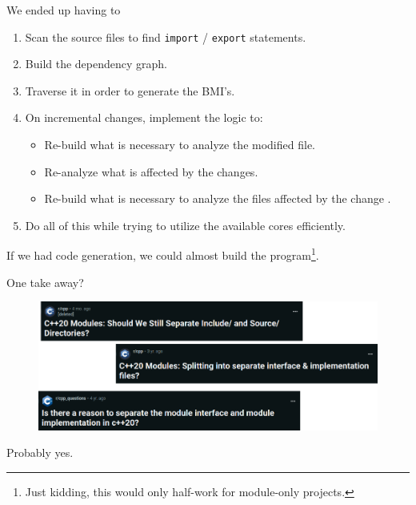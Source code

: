 \documentclass[]{beamer}
\begin{document}
\begin{frame}{We ended up having to}
  \begin{enumerate}
    \item Scan the source files to find \texttt{import} / \texttt{export} statements.
    \item Build the dependency graph.
    \item Traverse it in order to generate the BMI's.
    \item On incremental changes, implement the logic to:
          \begin{itemize}
            \item Re-build what is necessary to analyze the modified file.
            \item Re-analyze what is affected by the changes.
            \item Re-build what is necessary to analyze the files affected by the change .
          \end{itemize}
    \item Do all of this while trying to utilize the available cores efficiently.
  \end{enumerate}
  If we had code generation, we could almost build the program\footnote{\tiny Just kidding, this would only half-work for module-only projects.}.
\end{frame}

\begin{frame}{One take away?}
  \begin{figure}
    \includegraphics[width=\linewidth]{questions.png}
  \end{figure}
  \centering
  Probably yes.
\end{frame}
\end{document}

